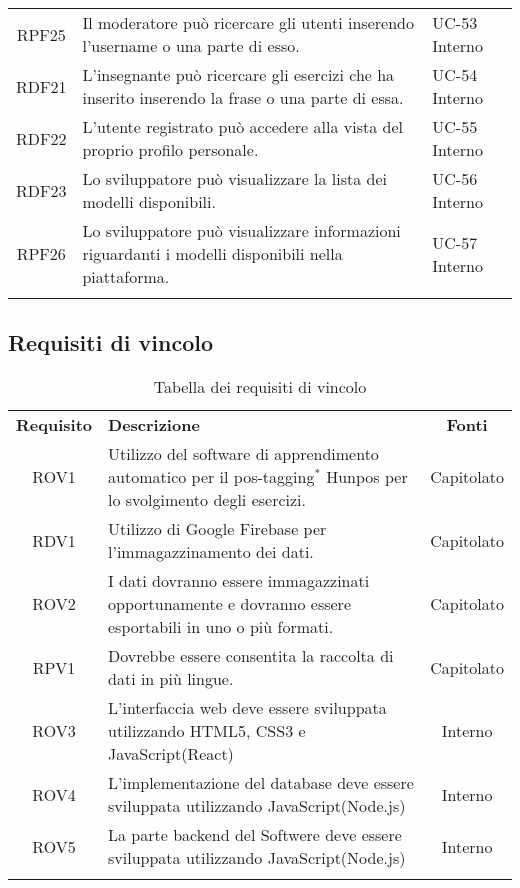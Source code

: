 \begin{tabularx}{\textwidth}{| c | p{10cm} | X |}
		RPF25 & Il moderatore può ricercare gli utenti inserendo l'username o una parte di esso. & UC-53 \newline Interno\\
		RDF21 & L'insegnante può ricercare gli esercizi che ha inserito inserendo la frase o una parte di essa. & UC-54 \newline Interno\\
		RDF22 & L'utente registrato può accedere alla vista del proprio profilo personale. & UC-55 \newline Interno\\
		RDF23 & Lo sviluppatore può visualizzare la lista dei modelli disponibili. & UC-56 \newline Interno\\
		RPF26 & Lo sviluppatore può visualizzare informazioni riguardanti i modelli disponibili nella piattaforma. & UC-57 \newline Interno\\
		\hline
		\caption{Tabella dei requisiti funzionali}
\end{tabularx}

\subsection{Requisiti di vincolo}
\begin{longtable}{| c | p{10cm} | c |}
		\rowcolor{LightBlue}
		\color{white}\bfseries Requisito & \color{white}\bfseries Descrizione & \color{white}\bfseries Fonti\\[0.25cm]
		ROV1 & Utilizzo del software di apprendimento automatico per il pos-tagging$^*$ Hunpos per lo svolgimento degli esercizi. & Capitolato \\
		RDV1 & Utilizzo di Google Firebase per l'immagazzinamento dei dati. & Capitolato \\
		ROV2 & I dati dovranno essere immagazzinati opportunamente e dovranno essere esportabili in uno o più formati. & Capitolato \\
		RPV1 & Dovrebbe essere consentita la raccolta di dati in più lingue. & Capitolato \\ 
		ROV3 & L’interfaccia web deve essere sviluppata utilizzando HTML5, CSS3 e JavaScript(React) & Interno\\
		ROV4 & L'implementazione del database deve essere sviluppata utilizzando JavaScript(Node.js) & Interno\\
		ROV5 & La parte backend del Softwere deve essere sviluppata utilizzando JavaScript(Node.js) & Interno\\
		\hline
		\caption{Tabella dei requisiti di vincolo}
\end{longtable}

